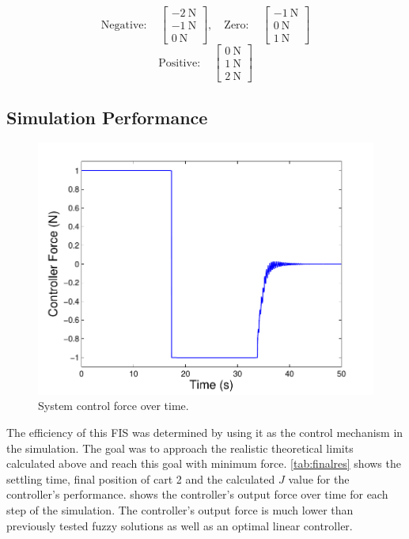 	
\begin{displaymath}
    \mathrm{Negative:}\quad 
        \begin{bmatrix}
            \SI{-2}{\newton}\\
            \SI{-1}{\newton}\\
            \SI{0}{\newton}
        \end{bmatrix}, \quad
    \mathrm{Zero:}\quad 
        \begin{bmatrix}
            \SI{-1}{\newton}\\
            \SI{0}{\newton}\\
            \SI{1}{\newton}
        \end{bmatrix}
\end{displaymath}
\begin{displaymath}
    \mathrm{Positive:}
    \quad 
        \begin{bmatrix}
            \SI{0}{\newton}\\
            \SI{1}{\newton}\\
            \SI{2}{\newton}
        \end{bmatrix}
\end{displaymath}

\subsection{Simulation Performance}\label{ss:simperf}
\begin{figure}[ht]
    \centering
    \includegraphics[width=0.8\linewidth]{images/FuzzyForcePlot.pdf} \caption{System control force over time.}
    \label{f:forceplot}
\end{figure}


The efficiency of this FIS was determined by using it as the control mechanism in the simulation. The goal was
to approach the realistic theoretical limits calculated above and reach this goal with minimum force.
\cref{tab:finalres} shows the settling time, final position of cart 2 and the calculated $J$ value for
the controller's performance.  shows the controller's output force over time for each
step of the simulation. The controller's output force is much lower than previously tested fuzzy solutions as
well as an optimal linear controller.


